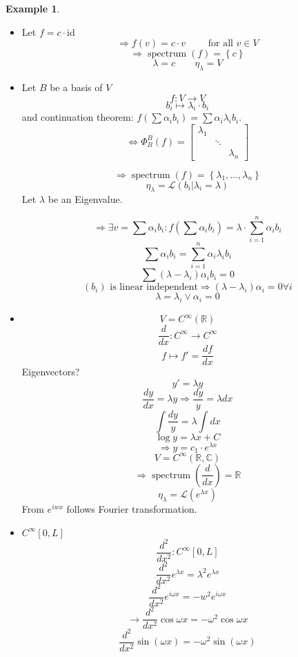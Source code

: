 \documentclass[a4paper,landscape,twocolumn]{article}
\newcommand\set[1]{\left\{#1\right\}}
\theoremstyle{definition}
\newtheorem{ex}{Example}
\DeclareMathOperator\spec{spectrum}
\begin{document}
\begin{ex}
  \label{bsp-10.3}
  \begin{itemize}
    \item Let $f = c \cdot \text{id}$
      \[ \Rightarrow f(v) = c \cdot v \qquad \text{ for all } v \in V \]
      \[ \Rightarrow \spec(f) = \set{c} \]
      \[ \lambda = c \qquad \eta_\lambda = V \]
    \item
      Let $B$ be a basis of $V$
      \[ f: V \to V \]
      \[ b_i \mapsto \lambda_i \cdot b_i \]
      and continuation theorem: $f(\sum \alpha_i b_i) = \sum \alpha_i \lambda_i b_i$.
      \[
        \Leftrightarrow \Phi_B^B(f) = \begin{bmatrix}
          \lambda_1 &        & \\
                    & \ddots & \\
                    &        & \lambda_n
        \end{bmatrix}
      \]

      \[ \Rightarrow \spec(f) = \set{\lambda_1, \ldots, \lambda_n} \]
      \[ \eta_\lambda = \mathcal L\left(b_i \left| \lambda_i = \lambda\right)\right. \]
      Let $\lambda$ be an Eigenvalue.

      \[
        \Rightarrow \exists v = \sum \alpha_i b_i:
        f\left(\sum \alpha_i b_i\right) = \lambda \cdot \sum_{i=1}^n \alpha_i b_i
      \] \[
        \sum \alpha_i b_i = \sum_{i=1}^n \alpha_i \lambda_i b_i
      \] \[
        \sum (\lambda - \lambda_i) \alpha_i b_i = 0
      \] \[
        (b_i) \text{ is linear independent} \Rightarrow (\lambda - \lambda_i) \alpha_i = 0 \forall i
      \] \[
        \lambda = \lambda_i \lor \alpha_i = 0
      \]
    \item
      \[ V = C^{\infty}(\mathbb R) \]
      \[ \frac{d}{dx}: C^{\infty} \to C^{\infty} \]
      \[ f \mapsto f' = \frac{df}{dx} \]
      Eigenvectors?
      \[ y' = \lambda y \]
      \[ \frac{dy}{dx} = \lambda y \Rightarrow \frac{dy}{y} = \lambda dx \]
      \[ \int \frac{dy}{y} = \lambda \int dx \]
      \[ \log{y} = \lambda x + C \]
      \[ \Rightarrow y = c_1 \cdot e^{\lambda x} \]
      \[ V = C^{\infty}(\mathbb R, \mathbb C) \]
      \[ \Rightarrow \spec\left(\frac{d}{dx}\right) = \mathbb R \]
      \[ \eta_\lambda = \mathcal L(e^{\lambda x}) \]
      From $e^{iwx}$ follows Fourier transformation.
    \item
      $C^\infty [0, L]$
      \[ \frac{d^2}{dx^2}: C^\infty [0,L] \]
      \[ \frac{d^2}{dx^2} e^{\lambda x} = \lambda^2 e^{\lambda x} \]
      \[ \frac{d^2}{dx^2} e^{i\omega x} = -w^2 e^{i\omega x} \]
      \[ \rightarrow \frac{d^2}{dx^2} \cos{\omega x} = -\omega^2 \cos{\omega x} \]
      \[ \frac{d^2}{dx^2} \sin(\omega x) = -\omega^2 \sin(\omega x) \]
  \end{itemize}
\end{ex}


\clearpage
\begin{otherlanguage}{ngerman}
\printindex[German]
\end{otherlanguage}
\printindex[English]
\end{document}
